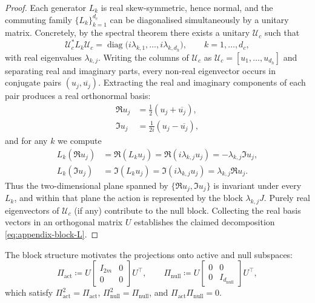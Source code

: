 \documentclass[11pt]{article}
\begin{document}
\begin{proof}
Each generator $L_k$ is real skew-symmetric, hence normal, and the commuting family
$\{L_k\}_{k=1}^{d_c}$ can be diagonalised simultaneously by a unitary matrix.  Concretely, by the
spectral theorem there exists a unitary $\mathcal{U}_c$ such that
\begin{equation}
  \mathcal{U}_c^* L_k \mathcal{U}_c
  = \operatorname{diag}\big(i\lambda_{k,1},\dots,i\lambda_{k,d_h}\big),
  \qquad k=1,\dots,d_c,
  \label{eq:appendix-unitary-diagonalisation}
\end{equation}
with real eigenvalues $\lambda_{k,j}$.  Writing the columns of $\mathcal{U}_c$ as
$\mathcal{U}_c = [u_1,\dots,u_{d_h}]$ and separating real and imaginary parts,
every non-real eigenvector occurs in conjugate pairs $(u_j,\overline{u_j})$.  Extracting the real and
imaginary components of each pair produces a real orthonormal basis:
\begin{align}
  \Re u_j &= \frac{1}{2}(u_j + \overline{u_j}),\\
  \Im u_j &= \frac{1}{2i}(u_j - \overline{u_j}),
\end{align}
and for any $k$ we compute
\begin{align}
  L_k (\Re u_j)
  &= \Re (L_k u_j)
   = \Re (i\lambda_{k,j} u_j)
   = -\lambda_{k,j} \Im u_j,\\
  L_k (\Im u_j)
  &= \Im (L_k u_j)
   = \Im (i\lambda_{k,j} u_j)
   = \lambda_{k,j} \Re u_j.
\end{align}
Thus the two-dimensional plane spanned by $\{\Re u_j,\Im u_j\}$ is invariant under every $L_k$, and
within that plane the action is represented by the block $\lambda_{k,j} J$.  Purely real eigenvectors
of $\mathcal{U}_c$ (if any) contribute to the null block.  Collecting the real basis vectors in an
orthogonal matrix $U$ establishes the claimed decomposition \eqref{eq:appendix-block-L}.
\end{proof}

The block structure motivates the projections onto active and null subspaces:
\begin{equation}
  \Pi_{\mathrm{act}} \coloneqq U
  \begin{bmatrix}
    I_{2m} & 0\\
    0 & 0
  \end{bmatrix}
  U^\top,
  \qquad
  \Pi_{\mathrm{null}} \coloneqq U
  \begin{bmatrix}
    0 & 0\\
    0 & I_{d_{\mathrm{null}}}
  \end{bmatrix}
  U^\top,
  \label{eq:appendix-projections}
\end{equation}
which satisfy $\Pi_{\mathrm{act}}^2 = \Pi_{\mathrm{act}}$, $\Pi_{\mathrm{null}}^2 = \Pi_{\mathrm{null}}$, and
$\Pi_{\mathrm{act}}\Pi_{\mathrm{null}} = 0$.
\end{document}

